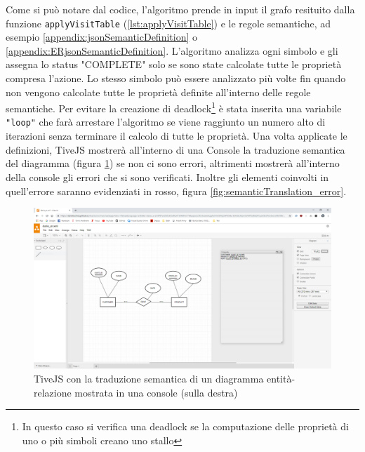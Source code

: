                 Come si può notare dal codice, l'algoritmo prende in input il grafo resituito dalla funzione \texttt{applyVisitTable} (\ref{lst:applyVisitTable}) e le regole semantiche, ad esempio \ref{appendix:jsonSemanticDefinition} o \ref{appendix:ERjsonSemanticDefinition}.
                L'algoritmo analizza ogni simbolo e gli assegna lo status "COMPLETE" solo se sono state calcolate tutte le proprietà compresa l'azione. Lo stesso simbolo può essere analizzato più volte fin quando non vengono calcolate tutte le proprietà definite all'interno delle regole semantiche. Per evitare la creazione di deadlock\footnote{In questo caso si verifica una deadlock se la computazione delle proprietà di uno o più simboli creano uno stallo} è stata inserita una variabile \texttt{"loop"} che farà arrestare l'algoritmo se viene raggiunto un numero alto di iterazioni senza terminare il calcolo di tutte le proprietà.
                \newline
                Una volta applicate le definizioni, TiveJS mostrerà all'interno di una Console la traduzione semantica del diagramma (figura \ref{fig:semanticTranslation}) se non ci sono errori, altrimenti mostrerà all'interno della console gli errori che si sono verificati. Inoltre gli elementi coinvolti in quell'errore saranno evidenziati in rosso, figura \ref{fig:semanticTranslation_error}.
                \begin{figure}[htbp]
                    \centering
                    \includegraphics[scale=0.20]{Figure/semanticTranslation.PNG}
                    \caption{TiveJS con la traduzione semantica di un diagramma entità-relazione mostrata in una console (sulla destra)}
                    \label{fig:semanticTranslation}
                \end{figure}

